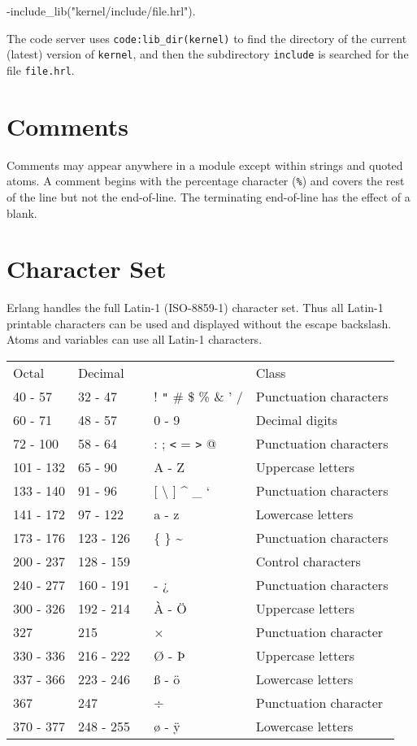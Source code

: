 \begin{erlang}
-include_lib("kernel/include/file.hrl").
\end{erlang}

The code server uses \texttt{code:lib\_dir(kernel)} to find the
directory of the current (latest) version of \texttt{kernel}, and then
the subdirectory \texttt{include} is searched for the file \texttt{file.hrl}.


\section{Comments}
Comments may appear anywhere in a module except within strings and
quoted atoms.  A comment begins with the percentage character
(\texttt{\%}) and covers the rest of the line but not the
end-of-line. The terminating end-of-line has the effect of a blank.


\section{Character Set}
Erlang handles the full Latin-1 (ISO-8859-1) character set. Thus all
Latin-1 printable characters can be used and displayed without the
escape backslash. Atoms and variables can use all Latin-1 characters.

\vspace*{12pt}
\begin{center}
\begin{tabular}{|>{\raggedright}p{52pt}|>{\raggedright}p{53pt}|>{\raggedright}p{103pt}|>{\raggedright}p{87pt}|}
\hline
\multicolumn{4}{|p{297pt}|}{Character classes}\tabularnewline
\hline
Octal & Decimal~ &   & Class\tabularnewline
\hline
40 -  57 & 32 - 47 &  ! \texttt{"} \# \$ \% \& ' / & Punctuation
characters\tabularnewline
\hline
60 -  71 & 48 - 57 & 0 - 9 & Decimal digits\tabularnewline
\hline
72 - 100 & 58 - 64 & : ; \texttt{<} = \texttt{>} @ & Punctuation characters\tabularnewline
\hline
101 - 132 &  65 - 90 & A - Z & Uppercase letters\tabularnewline
\hline
133 - 140 &  91 - 96 & [ \textbackslash{} ] \textasciicircum{} \_ ` & Punctuation
characters\tabularnewline
\hline
141 - 172 &  97 - 122 & a  -  z & Lowercase letters\tabularnewline
\hline
173 - 176 & 123 - 126 & \{ \textbar{} \} \textasciitilde{} & Punctuation characters\tabularnewline
\hline
200 - 237 & 128 - 159 ~ &   & Control characters \tabularnewline
\hline
240 - 277 & 160 - 191 & - ¿  & Punctuation characters \tabularnewline
\hline
300 - 326 & 192 - 214 & À - Ö  & Uppercase letters \tabularnewline
\hline
327  & 215 & ×  & Punctuation character \tabularnewline
\hline
330 - 336 & 216 - 222 & Ø - Þ  & Uppercase letters \tabularnewline
\hline
337 - 366 & 223 - 246 & ß - ö  & Lowercase letters \tabularnewline
\hline
367  & 247 & ÷  & Punctuation character \tabularnewline
\hline
370 - 377 & 248 - 255 & ø - ÿ  & Lowercase letters \tabularnewline
\hline
\end{tabular}
\end{center}

